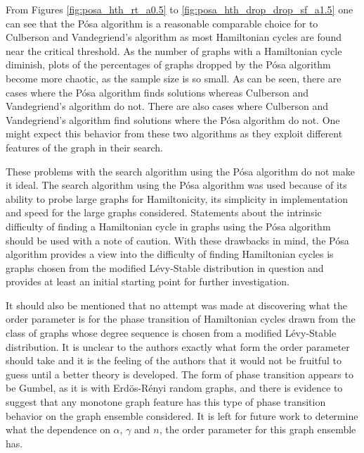 \documentclass[twoside,11pt]{article}
\begin{document}
From Figures
\ref{fig:posa_hth_rt_a0.5} to \ref{fig:posa_hth_drop_drop_sf_a1.5}
one can see that the P\'osa algorithm is a reasonable comparable choice for
to Culberson and Vandegriend's algorithm
as most Hamiltonian cycles are found near the critical threshold.
As the number of graphs with a Hamiltonian cycle diminish,
plots of the percentages of graphs dropped
by the P\'osa algorithm become more chaotic, as the
sample size is so small.
As can be seen, there are cases where the P\'osa algorithm
finds solutions whereas Culberson and Vandegriend's
algorithm do not.  There are also cases where Culberson and Vandegriend's
algorithm find solutions where the P\'osa algorithm do not.
One might expect this behavior from these two algorithms as
they exploit different features of the graph in their search.

These problems with the search algorithm using the P\'osa algorithm do not make it ideal.  The search algorithm using the P\'osa
algorithm was used because of its ability to probe large graphs for Hamiltonicity, its simplicity in implementation and speed
for the large graphs considered.  Statements about the intrinsic difficulty
of finding a Hamiltonian cycle in graphs using the P\'osa algorithm should be used with a note of caution.
With these drawbacks in mind,
the P\'osa algorithm provides a view into the difficulty of finding Hamiltonian cycles is graphs chosen
from the modified L\'evy-Stable distribution in question and provides at least an initial starting point for further
investigation.

It should also be mentioned that no attempt was made at discovering what the order parameter is for the phase transition of Hamiltonian
cycles drawn from the class of graphs whose degree sequence is chosen from a modified L\'evy-Stable distribution.  It is unclear
to the authors exactly what form the order parameter should take and 
it is the feeling of the authors that 
it would not be fruitful to guess until a better
theory is developed.  The form of phase transition appears to be Gumbel, as it is with Erd\"os-R\'enyi random graphs, and there
is evidence to suggest that any monotone graph feature has this type of phase transition behavior \cite{friedgut_kalai}
on the graph ensemble considered.
It is left for future work to determine what the dependence on $\alpha$, $\gamma$ and $n$, the order parameter for this
graph ensemble has.
\end{document}
